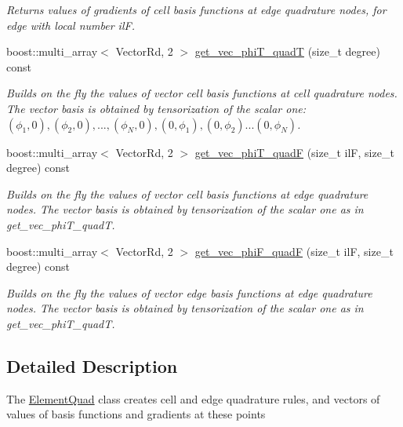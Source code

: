 \begin{DoxyCompactItemize}
\begin{DoxyCompactList}\small\item\em Returns values of gradients of cell basis functions at edge quadrature nodes, for edge with local number ilF. \end{DoxyCompactList}\item 
boost\+::multi\+\_\+array$<$ Vector\+Rd, 2 $>$ \hyperlink{classHArDCore2D_1_1ElementQuad_a3c549d43c0a5171d0c14f6b56ffc843d}{get\+\_\+vec\+\_\+phi\+T\+\_\+quadT} (size\+\_\+t degree) const
\begin{DoxyCompactList}\small\item\em Builds on the fly the values of vector cell basis functions at cell quadrature nodes. The vector basis is obtained by tensorization of the scalar one\+: $(\phi_1,0), (\phi_2,0), ..., (\phi_N,0), (0,\phi_1), (0,\phi_2) ... (0,\phi_N)$. \end{DoxyCompactList}\item 
boost\+::multi\+\_\+array$<$ Vector\+Rd, 2 $>$ \hyperlink{classHArDCore2D_1_1ElementQuad_ad470965a0f66f62c1ffed045e2dd49fc}{get\+\_\+vec\+\_\+phi\+T\+\_\+quadF} (size\+\_\+t ilF, size\+\_\+t degree) const
\begin{DoxyCompactList}\small\item\em Builds on the fly the values of vector cell basis functions at edge quadrature nodes. The vector basis is obtained by tensorization of the scalar one as in get\+\_\+vec\+\_\+phi\+T\+\_\+quadT. \end{DoxyCompactList}\item 
boost\+::multi\+\_\+array$<$ Vector\+Rd, 2 $>$ \hyperlink{classHArDCore2D_1_1ElementQuad_a862a7cc1c7f5e62bcb26c5a2a14bb4ea}{get\+\_\+vec\+\_\+phi\+F\+\_\+quadF} (size\+\_\+t ilF, size\+\_\+t degree) const
\begin{DoxyCompactList}\small\item\em Builds on the fly the values of vector edge basis functions at edge quadrature nodes. The vector basis is obtained by tensorization of the scalar one as in get\+\_\+vec\+\_\+phi\+T\+\_\+quadT. \end{DoxyCompactList}\end{DoxyCompactItemize}


\subsection{Detailed Description}
The \hyperlink{classHArDCore2D_1_1ElementQuad}{Element\+Quad} class creates cell and edge quadrature rules, and vectors of values of basis functions and gradients at these points 

